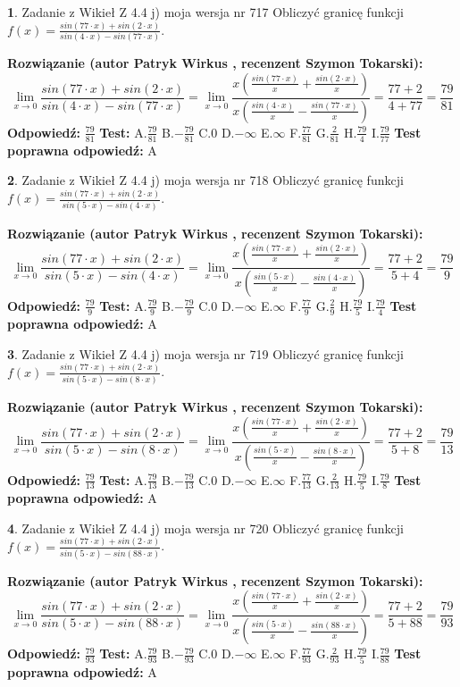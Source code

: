 \documentclass[12pt, a4paper]{article}
\theoremstyle{definition} %
\newtheorem{zad}{}
\newcommand{\zadStart}[1]{\begin{zad}#1\newline}
\newcommand{\zadStop}{\end{zad}}
\newcommand{\rozwStart}[2]{\noindent \textbf{Rozwiązanie (autor #1 , recenzent #2): }\newline}
\newcommand{\rozwStop}{\newline}
\newcommand{\odpStart}{\noindent \textbf{Odpowiedź:}\newline}
\newcommand{\odpStop}{\newline}
\newcommand{\testStart}{\noindent \textbf{Test:}\newline}
\newcommand{\testStop}{\newline}
\newcommand{\kluczStart}{\noindent \textbf{Test poprawna odpowiedź:}\newline}
\newcommand{\kluczStop}{\newline}
\begin{document}
\zadStart{Zadanie z Wikieł Z 4.4 j) moja wersja nr 717}
Obliczyć granicę funkcji $f(x)=\frac{sin(77\cdot x) +sin(2\cdot x)}{sin(4\cdot x) -sin(77\cdot x)}$.
\zadStop
\rozwStart{Patryk Wirkus}{Szymon Tokarski}
$$\lim\limits_{x\to 0}\frac{sin(77\cdot x) +sin(2\cdot x)}{sin(4\cdot x) -sin(77\cdot x)}=\lim\limits_{x\to 0}\frac{x(\frac{sin(77\cdot x)}{x}+\frac{sin(2\cdot x)}{x})}{x(\frac{sin(4\cdot x)}{x}-\frac{sin(77\cdot x)}{x})}=\frac{77+2}{4+77} = \frac{79}{81}$$
\rozwStop
\odpStart
$\frac{79}{81}$
\odpStop
\testStart
A.$\frac{79}{81}$
B.$-\frac{79}{81}$
C.$0$
D.$-\infty$
E.$\infty$
F.$\frac{77}{81}$
G.$\frac{2}{81}$
H.$\frac{79}{4}$
I.$\frac{79}{77}$
\testStop
\kluczStart
A
\kluczStop



\zadStart{Zadanie z Wikieł Z 4.4 j) moja wersja nr 718}
Obliczyć granicę funkcji $f(x)=\frac{sin(77\cdot x) +sin(2\cdot x)}{sin(5\cdot x) -sin(4\cdot x)}$.
\zadStop
\rozwStart{Patryk Wirkus}{Szymon Tokarski}
$$\lim\limits_{x\to 0}\frac{sin(77\cdot x) +sin(2\cdot x)}{sin(5\cdot x) -sin(4\cdot x)}=\lim\limits_{x\to 0}\frac{x(\frac{sin(77\cdot x)}{x}+\frac{sin(2\cdot x)}{x})}{x(\frac{sin(5\cdot x)}{x}-\frac{sin(4\cdot x)}{x})}=\frac{77+2}{5+4} = \frac{79}{9}$$
\rozwStop
\odpStart
$\frac{79}{9}$
\odpStop
\testStart
A.$\frac{79}{9}$
B.$-\frac{79}{9}$
C.$0$
D.$-\infty$
E.$\infty$
F.$\frac{77}{9}$
G.$\frac{2}{9}$
H.$\frac{79}{5}$
I.$\frac{79}{4}$
\testStop
\kluczStart
A
\kluczStop



\zadStart{Zadanie z Wikieł Z 4.4 j) moja wersja nr 719}
Obliczyć granicę funkcji $f(x)=\frac{sin(77\cdot x) +sin(2\cdot x)}{sin(5\cdot x) -sin(8\cdot x)}$.
\zadStop
\rozwStart{Patryk Wirkus}{Szymon Tokarski}
$$\lim\limits_{x\to 0}\frac{sin(77\cdot x) +sin(2\cdot x)}{sin(5\cdot x) -sin(8\cdot x)}=\lim\limits_{x\to 0}\frac{x(\frac{sin(77\cdot x)}{x}+\frac{sin(2\cdot x)}{x})}{x(\frac{sin(5\cdot x)}{x}-\frac{sin(8\cdot x)}{x})}=\frac{77+2}{5+8} = \frac{79}{13}$$
\rozwStop
\odpStart
$\frac{79}{13}$
\odpStop
\testStart
A.$\frac{79}{13}$
B.$-\frac{79}{13}$
C.$0$
D.$-\infty$
E.$\infty$
F.$\frac{77}{13}$
G.$\frac{2}{13}$
H.$\frac{79}{5}$
I.$\frac{79}{8}$
\testStop
\kluczStart
A
\kluczStop



\zadStart{Zadanie z Wikieł Z 4.4 j) moja wersja nr 720}
Obliczyć granicę funkcji $f(x)=\frac{sin(77\cdot x) +sin(2\cdot x)}{sin(5\cdot x) -sin(88\cdot x)}$.
\zadStop
\rozwStart{Patryk Wirkus}{Szymon Tokarski}
$$\lim\limits_{x\to 0}\frac{sin(77\cdot x) +sin(2\cdot x)}{sin(5\cdot x) -sin(88\cdot x)}=\lim\limits_{x\to 0}\frac{x(\frac{sin(77\cdot x)}{x}+\frac{sin(2\cdot x)}{x})}{x(\frac{sin(5\cdot x)}{x}-\frac{sin(88\cdot x)}{x})}=\frac{77+2}{5+88} = \frac{79}{93}$$
\rozwStop
\odpStart
$\frac{79}{93}$
\odpStop
\testStart
A.$\frac{79}{93}$
B.$-\frac{79}{93}$
C.$0$
D.$-\infty$
E.$\infty$
F.$\frac{77}{93}$
G.$\frac{2}{93}$
H.$\frac{79}{5}$
I.$\frac{79}{88}$
\testStop
\kluczStart
A
\kluczStop
\end{document}

